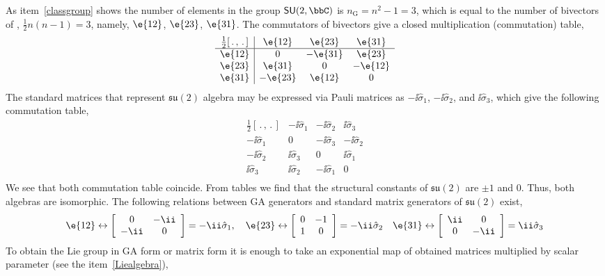 \begin{example}
\begin{example}
As item~\ref{classgroup} shows the number of elements in the group
$\mathsf{SU}(2,\bbC)$ is $n_{\mathrm{G}}=n^2-1=3$, which is equal
to the number of bivectors of , $\tfrac{1}{2}n(n-1)=3$,
namely, $\e{12}$, $\e{23}$, $\e{31}$. The commutators of bivectors
give a closed multiplication (commutation) table,
\[\begin{array}{c|ccc}
\tfrac{1}{2}[\,.\,,\,.\,] &\e{12}&\e{23}&\e{31}\\
\hline
 \e{12}&0 &-\e{31} &\e{23} \\
 \e{23}&\e{31} &0 &-\e{12} \\
 \e{31}&-\e{23}&\e{12} &0 \\
\end{array}\]
The standard matrices that represent $\mathfrak{su}(2)$ algebra
may be expressed via Pauli matrices as $-\ii\hat{\sigma}_1$,
$-\ii\hat{\sigma}_2$, and $\ii\hat{\sigma}_3$, which give the
following commutation table,
\[\begin{array}{c|ccc}
\tfrac{1}{2}[\,.\,,\,.\,] &-\ii\hat{\sigma}_1&-\ii\hat{\sigma}_2&\ii\hat{\sigma}_3\\
\hline
 -\ii\hat{\sigma}_1&0 &-\ii\hat{\sigma}_3 &-\ii\hat{\sigma}_2 \\
 -\ii\hat{\sigma}_2&\ii\hat{\sigma}_3 &0 &\ii\hat{\sigma}_1 \\
 \ii\hat{\sigma}_3&\ii\hat{\sigma}_2&-\ii\hat{\sigma}_1 &0 \\
\end{array}\]
We see that both commutation table coincide. From tables we find
that the structural constants of $\mathfrak{su}(2)$ are $\pm 1$
and $0$.  Thus, both algebras are isomorphic. The following
relations between  GA generators and standard matrix generators of
$\mathfrak{su}(2)$ exist,
$$
\e{12}\leftrightarrow\left[\begin{array}{cc}0&
-\ii\\-\ii&0\end{array}\right]=-\ii\hat{\sigma}_1,\quad
\e{23}\leftrightarrow\left[\begin{array}{cc}0&-1\\1&0\end{array}\right]=-\ii\hat{\sigma}_2\quad
\e{31}\leftrightarrow\left[\begin{array}{cc}\ii&0\\0&-\ii\end{array}\right]=\ii\hat{\sigma}_3
$$
To obtain the Lie group in GA form or matrix form it is enough to
take an exponential map of obtained matrices multiplied by scalar
parameter (see the item~\ref{Liealgebra}),

\end{example}
\end{example}
